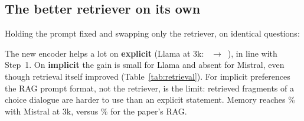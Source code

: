 \documentclass[11pt,a4paper]{article}
\begin{document}
\subsection{The better retriever on its own}
Holding the prompt fixed and swapping only the retriever, on identical questions:
\begin{table}[H]
\centering\small
\resizebox{\linewidth}{!}{}
\caption{RAG with SimCSE (Phase~1) vs RAG with EmbeddingGemma-2 (Phase~3), same prompt builder, same questions.}
\label{tab:ragsame}
\end{table}
The new encoder helps a lot on \textbf{explicit} (Llama at 3k: \qLlExRagThree{}~$\rightarrow$~\qLlExGemThree), in line with Step~1. On \textbf{implicit} the gain is
small for Llama and absent for Mistral, even though retrieval itself improved (Table~\ref{tab:retrieval}). For implicit preferences the RAG prompt
format, not the retriever, is the limit: retrieved fragments of a choice dialogue are harder to use than an explicit statement. Memory reaches
\qMiImMemThree\% with Mistral at 3k, versus \qMiImRagThree\% for the paper's RAG.
\end{document}
